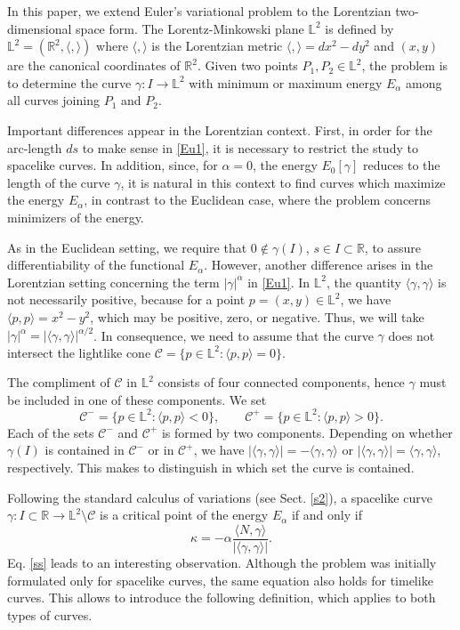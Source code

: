 \documentclass[a4paper,12pt]{amsart}
\theoremstyle{definition}
\def\r{\mathbb R}
\def\l{\mathbb L}
\begin{document}
In this paper, we extend Euler's variational problem to the Lorentzian two-dimensional space form. The  Lorentz-Minkowski plane $\l^2$ is defined by  $\l^2=(\r^{2},\langle,\rangle)$ where $\langle,\rangle$ is the  Lorentzian  metric   $\langle,\rangle=dx^2-dy^2$ and   $(x,y)$ are the canonical coordinates of $\r^{2}$. Given two points $P_1, P_2\in\l^2$, the problem is to determine the curve $\gamma\colon I\to\l^2$ with minimum or maximum energy $E_\alpha$ among all curves joining $P_1$ and $P_2$.  

Important differences appear in the Lorentzian context. First, in order for the arc-length $ds$ to make sense  in \eqref{Eu1}, it is necessary to restrict the study to spacelike curves. In addition, since, for $\alpha=0$, the energy $E_0[\gamma]$ reduces to the length of the curve $\gamma$, it is natural in this context to find curves which maximize the energy $E_\alpha$, in contrast to the Euclidean case, where the problem concerns minimizers of the energy.

As in the Euclidean setting, we require that $0\not\in \gamma(I)$, $s\in I\subset \r$, to assure differentiability of the functional $E_\alpha$. However, another difference arises in the Lorentzian setting concerning the term $|\gamma|^\alpha$ in \eqref{Eu1}. In $\l^2$, the quantity $\langle \gamma,\gamma\rangle$ is not necessarily positive, because for a point $p=(x,y)\in\l^2$, we have $\langle p,p\rangle=x^2-y^2$, which may be positive, zero, or negative. Thus, we will take $|\gamma|^\alpha=|\langle\gamma,\gamma\rangle|^{\alpha/2}$. In consequence,  we need to assume that the curve $\gamma$ does not intersect the lightlike cone $\mathcal{C}=\{p\in\l^2\colon \langle p,p\rangle=0\}$.  

The compliment of $\mathcal{C}$ in $\l^2$ consists of four connected components, hence $\gamma$ must be included in one of these components. We set
$$\mathcal{C}^-=\{p\in\l^2\colon \langle p,p\rangle <0\},\qquad \mathcal{C}^+=\{p\in\l^2\colon \langle p,p\rangle >0\}.$$
Each of the sets $\mathcal{C}^-$ and $\mathcal{C}^+$ is formed by two components. Depending on whether $\gamma(I)$ is contained in $\mathcal{C}^-$ or in $\mathcal{C}^+$, we have $|\langle\gamma,\gamma\rangle|=-\langle\gamma,\gamma\rangle$ or $|\langle\gamma,\gamma\rangle|=\langle\gamma,\gamma\rangle$, respectively.   This makes  to distinguish in which set the curve is contained. 

Following the standard calculus of variations (see Sect. \ref{s2}), a spacelike curve $\gamma\colon I\subset\r\to\l^2\setminus\mathcal{C}$ is a critical point of the energy $E_\alpha$ if and only if 
\begin{equation}\label{ss}
\kappa= -\alpha \frac{ \langle N,\gamma\rangle}{|\langle \gamma,\gamma\rangle|}.
\end{equation}
Eq. \eqref{ss} leads to an interesting observation. Although the problem was initially formulated only for spacelike curves, the same equation also holds for timelike curves. This allows to introduce the following definition, which applies to both types of curves.
 
\end{document}
